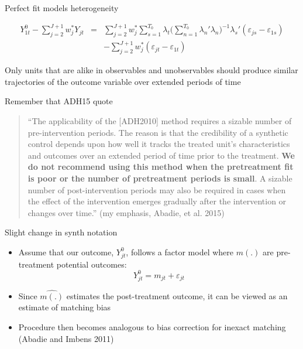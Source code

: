 \documentclass{beamer}
\begin{document}
\begin{frame}{Perfect fit models heterogeneity}


\begin{eqnarray*}
Y^0_{1t} - \sum^{J+1}_{j=2}w^*_jY_{jt} &=& \sum_{j=2}^{J+1} w_j^* \sum_{s=1}^{T_0} \lambda_t \bigg ( \sum_{n=1}^{T_0} \lambda_n'\lambda_n \bigg )
^{-1} \lambda_s'(\varepsilon_{js} - \varepsilon_{1s} ) \\
&& - \sum_{j=2}^{J+1} w_j^* (\varepsilon_{jt} - \varepsilon_{1t})
\end{eqnarray*}

Only units that are alike in observables and unobservables should produce similar trajectories of the outcome variable over extended periods of time


\end{frame}


\begin{frame}{Remember that ADH15 quote}

\begin{quote}
``The applicability of the [ADH2010] method requires a sizable number of pre-intervention periods. The reason is that the credibility of a synthetic control depends upon how well it tracks the treated unit’s characteristics and outcomes over an extended period of time prior to the treatment. \textbf{We do not recommend using this method when the pretreatment fit is poor or the number of pretreatment periods is small}. A sizable number of post-intervention periods may also be required in cases when the effect of the intervention emerges gradually after the intervention or changes over time.'' (my emphasis, Abadie, et al. 2015)
\end{quote}

\end{frame}

\begin{frame}{Slight change in synth notation}

\begin{itemize}
\item Assume that our outcome, $Y^0_{jt}$, follows a factor model where $m(.)$ are pre-treatment potential outcomes: $$ Y_{jt}^0 = m_{jt} + \varepsilon_{jt}$$
\item Since $\widehat{m(.)}$ estimates the post-treatment outcome, it can be viewed as an estimate of matching bias
\item Procedure then becomes analogous to bias correction for inexact matching (Abadie and Imbens 2011)
\end{itemize}

\end{frame}
\end{document}
